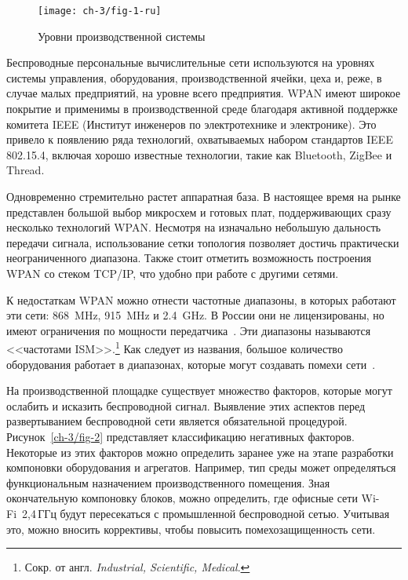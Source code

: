 \begin{figure*} [tb]
	\centering
	\texttt{[image: ch-3/fig-1-ru]}
	\caption{Уровни производственной системы}
	\label{ch-3/fig-1}
\end{figure*}

Беспроводные персональные вычислительные сети используются на уровнях системы управления, оборудования, производственной ячейки, цеха и, реже, в случае малых предприятий, на уровне всего предприятия. WPAN имеют широкое покрытие и применимы в производственной среде благодаря активной поддержке комитета IEEE (Институт инженеров по электротехнике и электронике). Это привело к появлению ряда технологий, охватываемых набором стандартов IEEE 802.15.4, включая хорошо известные технологии, такие как Bluetooth, ZigBee и Thread.

Одновременно стремительно растет аппаратная база. В настоящее время на рынке представлен большой выбор микросхем и готовых плат, поддерживающих сразу несколько технологий WPAN. Несмотря на изначально небольшую дальность передачи сигнала, использование сетки топология позволяет достичь практически неограниченного диапазона. Также стоит отметить возможность построения WPAN со стеком TCP/IP, что удобно при работе с другими сетями.

К недостаткам WPAN можно отнести частотные диапазоны, в которых работают эти сети: \SI{868}{\mega\hertz}, \SI{915}{\mega\hertz} и \SI{2,4}{\giga\hertz}. В России они не лицензированы, но имеют ограничения по мощности передатчика~\cite{freq}. Эти диапазоны называются <<частотами ISM>>.\footnote{Сокр. от англ. \textit{Industrial, Scientific, Medical}.} Как следует из названия, большое количество оборудования работает в диапазонах, которые могут создавать помехи сети~\cite{750064, 6209430}.

На производственной площадке существует множество факторов, которые могут ослабить и исказить беспроводной сигнал. Выявление этих аспектов перед развертыванием беспроводной сети является обязательной процедурой. Рисунок~\cref{ch-3/fig-2} представляет классификацию негативных факторов. Некоторые из этих факторов можно определить заранее уже на этапе разработки компоновки оборудования и агрегатов. Например, тип среды может определяться функциональным назначением производственного помещения. Зная окончательную компоновку блоков, можно определить, где офисные сети Wi-Fi~2,4\,ГГц будут пересекаться с промышленной беспроводной сетью. Учитывая это, можно вносить коррективы, чтобы повысить помехозащищенность сети.

